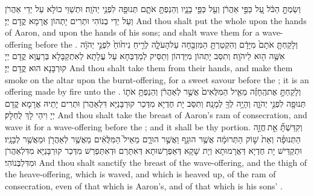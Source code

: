 {וְשַׂמְתָּ֣ הַכֹּ֔ל עַ֚ל כַּפֵּ֣י אַהֲרֹ֔ן וְעַ֖ל כַּפֵּ֣י בָנָ֑יו וְהֵנַפְתָּ֥ אֹתָ֛ם תְּנוּפָ֖ה לִפְנֵ֥י יְהֹוָֽה׃}
{וּתְשַׁוֵּי כוֹלָא עַל יְדֵי אַהֲרֹן וְעַל יְדֵי בְנוֹהִי וּתְרִים יָתְהוֹן אֲרָמָא קֳדָם יְיָ׃}
{And thou shalt put the whole upon the hands of Aaron, and upon the hands of his sons; and shalt wave them for a wave-offering before the \lord.}{}
{וְלָקַחְתָּ֤ אֹתָם֙ מִיָּדָ֔ם וְהִקְטַרְתָּ֥ הַמִּזְבֵּ֖חָה עַל\maqqaf הָעֹלָ֑ה לְרֵ֤יחַ נִיח֙וֹחַ֙ לִפְנֵ֣י יְהֹוָ֔ה אִשֶּׁ֥ה ה֖וּא לַיהֹוָֽה׃}
{וְתִסַּב יָתְהוֹן מִיַּדְהוֹן וְתַסֵּיק לְמַדְבְּחָא עַל עֲלָתָא לְאִתְקַבָּלָא בְּרַעֲוָא קֳדָם יְיָ קוּרְבָּנָא הוּא קֳדָם יְיָ׃}
{And thou shalt take them from their hands, and make them smoke on the altar upon the burnt-offering, for a sweet savour before the \lord; it is an offering made by fire unto the \lord.}{}
{וְלָקַחְתָּ֣ אֶת\maqqaf הֶֽחָזֶ֗ה מֵאֵ֤יל הַמִּלֻּאִים֙ אֲשֶׁ֣ר לְאַהֲרֹ֔ן וְהֵנַפְתָּ֥ אֹת֛וֹ תְּנוּפָ֖ה לִפְנֵ֣י יְהֹוָ֑ה וְהָיָ֥ה לְךָ֖ לְמָנָֽה׃}
{וְתִסַּב יָת חֶדְיָא מִדְּכַר קוּרְבָּנַיָּא דִּלְאַהֲרֹן וּתְרִים יָתֵיהּ אֲרָמָא קֳדָם יְיָ וִיהֵי לָךְ לֻחְלָק׃}
{And thou shalt take the breast of Aaron’s ram of consecration, and wave it for a wave-offering before the \lord; and it shall be thy portion.}{}
{וְקִדַּשְׁתָּ֞ אֵ֣ת \legarmeh  חֲזֵ֣ה הַתְּנוּפָ֗ה וְאֵת֙ שׁ֣וֹק הַתְּרוּמָ֔ה אֲשֶׁ֥ר הוּנַ֖ף וַאֲשֶׁ֣ר הוּרָ֑ם מֵאֵיל֙ הַמִּלֻּאִ֔ים מֵאֲשֶׁ֥ר לְאַהֲרֹ֖ן וּמֵאֲשֶׁ֥ר לְבָנָֽיו׃}
{וּתְקַדֵּישׁ יָת חֶדְיָא דַּאֲרָמוּתָא וְיָת שָׁקָא דְּאַפְרָשׁוּתָא דְּאִתָּרַם וּדְאִתַּפְרַשׁ מִדְּכַר קוּרְבָּנַיָּא מִדִּלְאַהֲרֹן וּמִדִּלְבְּנוֹהִי׃}
{And thou shalt sanctify the breast of the wave-offering, and the thigh of the heave-offering, which is waved, and which is heaved up, of the ram of consecration, even of that which is Aaron’s, and of that which is his sons’ .}{}
